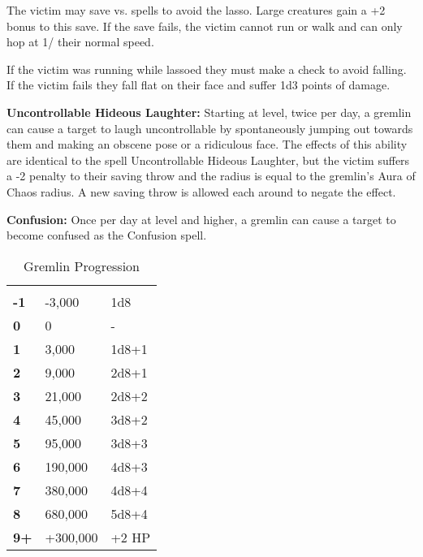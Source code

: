 \begin{multicols*}{2}
The victim may save vs. spells to avoid the lasso. Large creatures gain a +2 bonus to this save. If the save fails, the victim cannot run or walk and can only hop at 1/ their normal speed.

If the victim was running while lassoed they must make a  check to avoid falling. If the victim fails they fall flat on their face and suffer 1d3 points of damage.

\textbf{Uncontrollable Hideous Laughter:} Starting at  level, twice per day, a gremlin can cause a target to laugh uncontrollable by spontaneously jumping out towards them and making an obscene pose or a ridiculous face. The effects of this ability are identical to the spell Uncontrollable Hideous Laughter, but the victim suffers a -2 penalty to their saving throw and the radius is equal to the gremlin's Aura of Chaos radius. A new saving throw is allowed each around to negate the effect.

\textbf{Confusion:} Once per day at  level and higher, a gremlin can cause a target to become confused as the Confusion spell.


\begin {table}[H]
  \caption{Gremlin Progression}
  \begin{tabularx}{\columnwidth}{>{\bfseries}YYY}
	 &  & \\
	-1 & -3,000 & 1d8\\
	0 & 0 & -\\
	1 & 3,000 & 1d8+1\\
	2 & 9,000 & 2d8+1\\
	3 & 21,000 & 2d8+2\\
	4 & 45,000 & 3d8+2\\
	5 & 95,000 & 3d8+3\\
	6 & 190,000 & 4d8+3\\
	7 & 380,000 & 4d8+4\\
	8 & 680,000 & 5d8+4\\
	9+ & +300,000 & +2 HP
  \end {tabularx}
\end {table}


\end{multicols*}

